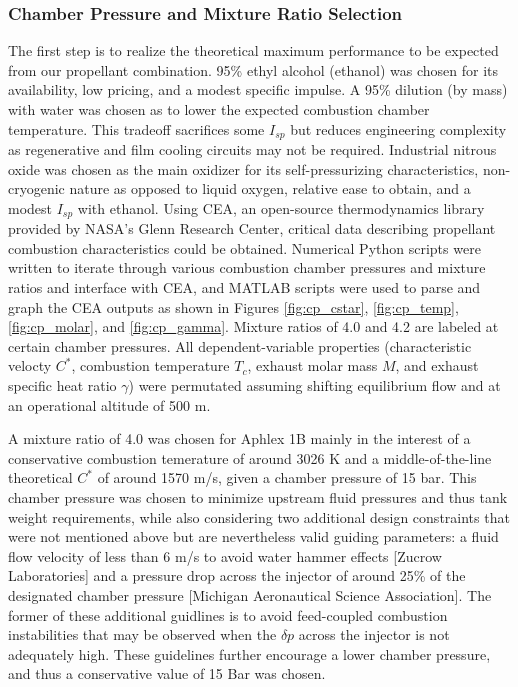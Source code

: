 \documentclass[9pt]{article} %
\numberwithin{equation}{section} %
\begin{document}
\subsubsection{Chamber Pressure and Mixture Ratio Selection}
\hspace{\parindent} The first step is to realize the theoretical maximum performance to be expected from our propellant combination.  95\% ethyl alcohol (ethanol) was chosen for its availability, low pricing, and a modest specific impulse. A 95\% dilution (by mass) with water was chosen as to lower the expected combustion chamber temperature. This tradeoff sacrifices some $I_{sp}$ but reduces engineering complexity as regenerative and film cooling circuits may not be required. Industrial nitrous oxide was chosen as the main oxidizer for its self-pressurizing characteristics, non-cryogenic nature as opposed to liquid oxygen, relative ease to obtain, and a modest $I_{sp}$ with ethanol.
Using CEA, an open-source thermodynamics library provided by NASA's Glenn Research Center, critical data describing propellant combustion characteristics could be obtained. Numerical Python scripts were written to iterate through various combustion chamber pressures and mixture ratios and interface with CEA, and MATLAB scripts were used to parse and graph the CEA outputs as shown in Figures \ref{fig:cp_cstar}, \ref{fig:cp_temp}, \ref{fig:cp_molar}, and \ref{fig:cp_gamma}. Mixture ratios of 4.0 and 4.2 are labeled at certain chamber pressures. All dependent-variable properties (characteristic velocty $C^{*}$, combustion temperature $T_{c}$, exhaust molar mass $M$, and exhaust specific heat ratio $\gamma$) were permutated assuming shifting equilibrium flow and at an operational altitude of 500 m. 

A mixture ratio of 4.0 was chosen for Aphlex 1B mainly in the interest of a conservative combustion temerature of around 3026 K and a middle-of-the-line theoretical $C^{*}$ of around 1570 m/s, given a chamber pressure of 15 bar. This chamber pressure was chosen to minimize upstream fluid pressures and thus tank weight requirements, while also considering two additional design constraints that were not mentioned above but are nevertheless valid guiding parameters: a fluid flow velocity of less than 6 m/s to avoid water hammer effects [Zucrow Laboratories] and a pressure drop across the injector of around 25\% of the designated chamber pressure [Michigan Aeronautical Science Association]. The former of these additional guidlines is to avoid feed-coupled combustion instabilities that may be observed when the $\delta p$ across the injector is not adequately high. These guidelines further encourage a lower chamber pressure, and thus a conservative value of 15 Bar was chosen.
\end{document}
